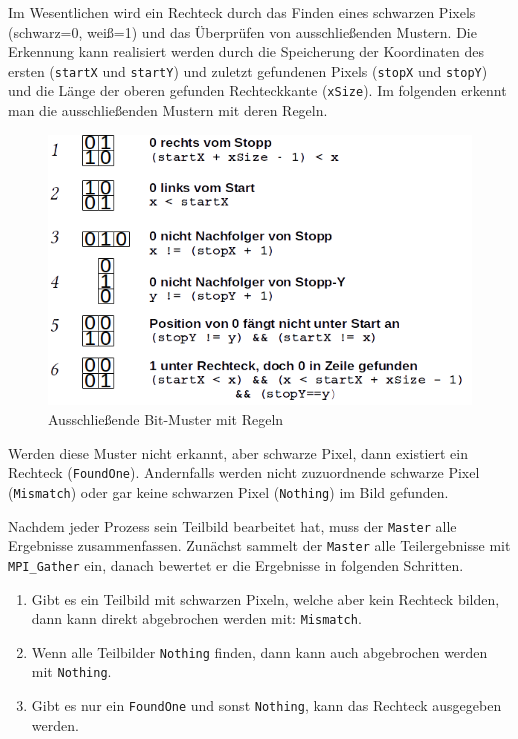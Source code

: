 Im Wesentlichen wird ein Rechteck durch das Finden eines schwarzen Pixels \linebreak(schwarz=0, weiß=1) und das Überprüfen von ausschließenden Mustern. 
Die Erkennung kann realisiert werden durch die Speicherung der Koordinaten des ersten (\texttt{startX} und \texttt{startY}) und zuletzt gefundenen Pixels (\texttt{stopX} und \texttt{stopY}) und die Länge der oberen gefunden Rechteckkante (\texttt{xSize}). Im folgenden erkennt man die ausschließenden Mustern mit deren Regeln.
\begin{figure}[htb]
    \centering
    \includegraphics[scale=0.75]{mismatches.png}
    \caption{Ausschließende Bit-Muster mit Regeln}
    \label{fig:mismatches}
\end{figure}

Werden diese Muster nicht erkannt, aber schwarze Pixel, dann existiert ein Rechteck (\texttt{FoundOne}). Andernfalls werden nicht zuzuordnende schwarze Pixel (\texttt{Mismatch}) oder gar keine schwarzen Pixel (\texttt{Nothing}) im Bild gefunden.

Nachdem jeder Prozess sein Teilbild bearbeitet hat, muss der \texttt{Master} alle Ergebnisse zusammenfassen. Zunächst sammelt der \texttt{Master} alle Teilergebnisse mit \texttt{MPI\_Gather} ein, danach bewertet er die Ergebnisse in folgenden Schritten.

\begin{enumerate}
	\item Gibt es ein Teilbild mit schwarzen Pixeln, welche aber kein Rechteck bilden, dann kann direkt abgebrochen werden mit: \texttt{Mismatch}.
	\item Wenn alle Teilbilder \texttt{Nothing} finden, dann kann auch abgebrochen werden mit \texttt{Nothing}.
	\item Gibt es nur ein \texttt{FoundOne} und sonst \texttt{Nothing}, kann das Rechteck ausgegeben werden.
\end{enumerate}

